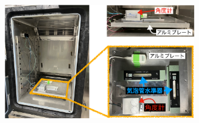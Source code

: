 \documentclass[../../main.tex]{subfiles}
\begin{document}
\begin{figure}[H]
    \centering
    \includegraphics[width=0.75\textwidth]{tiltsensor/evaluation_system_kyoto.pdf}
    \label{fig:evaluation_system_kyoto}
\end{figure}
\end{document}
